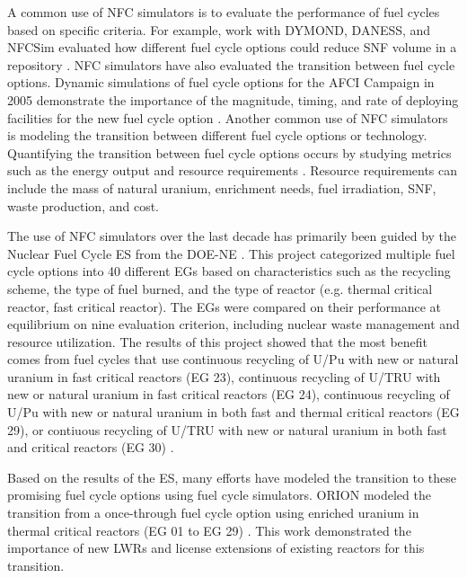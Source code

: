 A common use of \gls{NFC} simulators is to evaluate the performance 
of fuel cycles based on specific criteria. 
For example, work with \gls{DYMOND}, \gls{DANESS}, 
and \gls{NFCSim} evaluated how different fuel cycle options 
could reduce \gls{SNF} volume in a repository \cite{yacout_dynamic_2000}. 
\gls{NFC} simulators have also evaluated the transition between fuel cycle 
options. Dynamic simulations of fuel cycle options for the \gls{AFCI}
Campaign in 2005 demonstrate the importance of the magnitude, timing, 
and rate of deploying facilities for the new fuel cycle option 
\cite{piet_assessment_2011}.
Another common use of \gls{NFC} simulators is modeling the transition 
between 
different fuel cycle options or technology. Quantifying the transition 
between fuel cycle options occurs by studying metrics such as the 
energy output and resource requirements \cite{del_cul_advanced_2010}. 
Resource requirements can include the mass of natural uranium, enrichment 
needs, fuel irradiation, \gls{SNF}, waste production, and cost. 

The use of \gls{NFC} simulators over the 
last decade has primarily been guided by the Nuclear Fuel Cycle \gls{ES} 
from the \gls{DOE-NE} 
\cite{wigeland_nuclear_2014}. This project categorized 
multiple fuel cycle options into 40 different \glspl{EG} based on characteristics 
such as the recycling scheme, the type of fuel burned, 
and the type of reactor (e.g. thermal critical reactor, fast critical reactor). 
The \glspl{EG} were compared on their performance at equilibrium on nine evaluation 
criterion, including nuclear waste management and resource utilization. The 
results of this project showed that the most benefit comes from fuel cycles 
that use continuous recycling of U/Pu with new or natural uranium in fast critical 
reactors (\gls{EG} 23), continuous recycling of U/TRU with new or natural 
uranium in fast critical reactors (\gls{EG} 24), continuous recycling of U/Pu 
with new or natural uranium in both fast and thermal critical reactors 
(\gls{EG} 29), or contiuous recycling of U/TRU with new or natural uranium in 
both fast and critical reactors (\gls{EG} 30) \cite{wigeland_nuclear_2014}. 

Based on the results of the \gls{ES}, many efforts have modeled 
the transition to these promising fuel cycle options using fuel cycle 
simulators. ORION modeled the transition from a once-through 
fuel cycle option using enriched uranium in thermal critical reactors 
(\gls{EG} 01 to \gls{EG} 29) \cite{sunny_transition_2015}. This work 
demonstrated the importance of new \glspl{LWR} and license 
extensions of existing reactors for this transition. 

